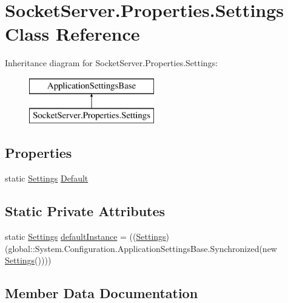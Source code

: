 \hypertarget{class_socket_server_1_1_properties_1_1_settings}{}\section{Socket\+Server.\+Properties.\+Settings Class Reference}
\label{class_socket_server_1_1_properties_1_1_settings}
Inheritance diagram for Socket\+Server.\+Properties.\+Settings\+:\begin{figure}[H]
\begin{center}
\leavevmode
\includegraphics[height=2.000000cm]{class_socket_server_1_1_properties_1_1_settings}
\end{center}
\end{figure}
\subsection*{Properties}
\begin{DoxyCompactItemize}
\item 
static \hyperlink{class_socket_server_1_1_properties_1_1_settings}{Settings} \hyperlink{class_socket_server_1_1_properties_1_1_settings_a7944b37c40f557280d233c0cfa179c2d}{Default}
\end{DoxyCompactItemize}
\subsection*{Static Private Attributes}
\begin{DoxyCompactItemize}
\item 
static \hyperlink{class_socket_server_1_1_properties_1_1_settings}{Settings} \hyperlink{class_socket_server_1_1_properties_1_1_settings_a5335d790e0262a7276d3c0879758bd10}{default\+Instance} = ((\hyperlink{class_socket_server_1_1_properties_1_1_settings}{Settings})(global\+::\+System.\+Configuration.\+Application\+Settings\+Base.\+Synchronized(new \hyperlink{class_socket_server_1_1_properties_1_1_settings}{Settings}())))
\end{DoxyCompactItemize}


\subsection{Member Data Documentation}
\mbox{\label{class_socket_server_1_1_properties_1_1_settings_a5335d790e0262a7276d3c0879758bd10}} 

